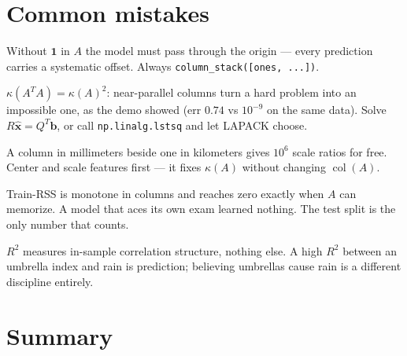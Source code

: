 \section{Common mistakes}\label{sec:lsq-mistakes}

\begin{tripwire}
Without $\mathbf 1$ in $A$ the model must pass through the origin ---
every prediction carries a systematic offset. Always
\texttt{column\_stack([ones, ...])}.
\end{tripwire}

\begin{tripwire}
$\kappa(A^{T}A)=\kappa(A)^{2}$: near-parallel columns turn a hard problem
into an impossible one, as the demo showed (err $0.74$ vs $10^{-9}$ on
the same data). Solve $R\hat{\mathbf x}=Q^{T}\mathbf b$, or call
\texttt{np.linalg.lstsq} and let LAPACK choose.
\end{tripwire}

\begin{tripwire}
A column in millimeters beside one in kilometers gives $10^{6}$ scale
ratios for free. Center and scale features first --- it fixes $\kappa(A)$
without changing $\operatorname{col}(A)$.
\end{tripwire}

\begin{tripwire}
Train-RSS is monotone in columns and reaches zero exactly when $A$ can
memorize. A model that aces its own exam learned nothing. The test split
is the only number that counts.
\end{tripwire}

\begin{tripwire}
$R^{2}$ measures in-sample correlation structure, nothing else. A high
$R^{2}$ between an umbrella index and rain is prediction; believing
umbrellas cause rain is a different discipline entirely.
\end{tripwire}

\section{Summary}

